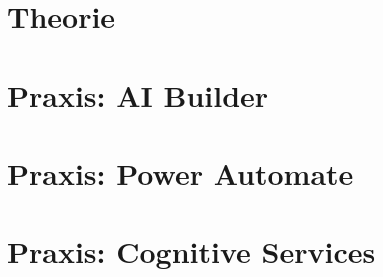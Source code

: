 
\section{Theorie}







\section{Praxis: AI Builder}



\section{Praxis: Power Automate}



\section{Praxis: Cognitive Services}


